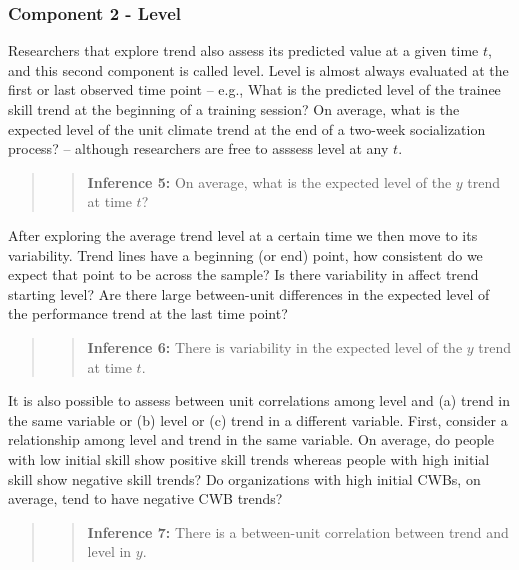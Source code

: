 \documentclass[english,,man]{apa6}
\theoremstyle{definition}
\theoremstyle{definition}
\theoremstyle{definition}
\theoremstyle{remark}
\begin{document}
\hypertarget{component-2---level}{%
\subsubsection{Component 2 - Level}\label{component-2---level}}

Researchers that explore trend also assess its predicted value at a
given time \(t\), and this second component is called level. Level is
almost always evaluated at the first or last observed time point --
e.g., What is the predicted level of the trainee skill trend at the
beginning of a training session? On average, what is the expected level
of the unit climate trend at the end of a two-week socialization
process? -- although researchers are free to asssess level at any \(t\).

\begin{quote}
\begin{quote}
\textbf{Inference 5:} On average, what is the expected level of the
\(y\) trend at time \(t\)?
\end{quote}
\end{quote}

After exploring the average trend level at a certain time we then move
to its variability. Trend lines have a beginning (or end) point, how
consistent do we expect that point to be across the sample? Is there
variability in affect trend starting level? Are there large between-unit
differences in the expected level of the performance trend at the last
time point?

\begin{quote}
\begin{quote}
\textbf{Inference 6:} There is variability in the expected level of the
\(y\) trend at time \(t\).
\end{quote}
\end{quote}

It is also possible to assess between unit correlations among level and
(a) trend in the same variable or (b) level or (c) trend in a different
variable. First, consider a relationship among level and trend in the
same variable. On average, do people with low initial skill show
positive skill trends whereas people with high initial skill show
negative skill trends? Do organizations with high initial CWBs, on
average, tend to have negative CWB trends?

\begin{quote}
\begin{quote}
\textbf{Inference 7:} There is a between-unit correlation between trend
and level in \(y\).
\end{quote}
\end{quote}
\end{document}
